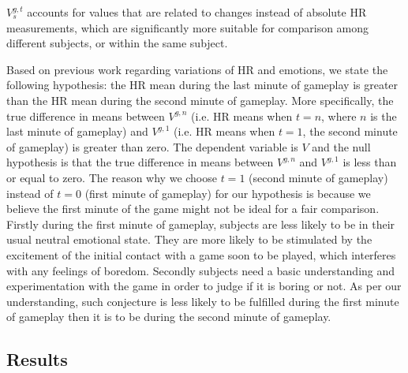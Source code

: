 $V_s^{g,t}$ accounts for values that are related to changes instead of absolute HR measurements, which are significantly more suitable for comparison among different subjects, or within the same subject.

Based on previous work regarding variations of HR and emotions, we state the following hypothesis: the HR mean during the last minute of gameplay is greater than the HR mean during the second minute of gameplay. More specifically, the true difference in means between $V^{g,n}$ (i.e. HR means when $t=n$, where $n$ is the last minute of gameplay) and $V^{g,1}$ (i.e. HR means when $t=1$, the second minute of gameplay) is greater than zero. The dependent variable is $V$ and the null hypothesis is that the true difference in means between $V^{g,n}$ and $V^{g,1}$ is less than or equal to zero. The reason why we choose $t=1$ (second minute of gameplay) instead of $t=0$ (first minute of gameplay) for our hypothesis is because we believe the first minute of the game might not be ideal for a fair comparison. Firstly during the first minute of gameplay, subjects are less likely to be in their usual neutral emotional state. They are more likely to be stimulated by the excitement of the initial contact with a game soon to be played, which interferes with any feelings of boredom. Secondly subjects need a basic understanding and experimentation with the game in order to judge if it is boring or not. As per our understanding, such conjecture is less likely to be fulfilled during the first minute of gameplay then it is to be during the second minute of gameplay.

\subsection{Results}

